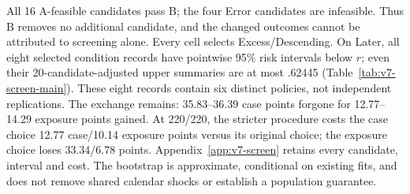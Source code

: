 All 16 A-feasible candidates pass B; the four Error candidates are infeasible. Thus B removes no additional candidate, and the changed outcomes cannot be attributed to screening alone. Every cell selects Excess/Descending. On Later, all eight selected condition records have pointwise 95\% risk intervals below $r$; even their 20-candidate-adjusted upper summaries are at most .62445 (Table~\ref{tab:v7-screen-main}). These eight records contain six distinct policies, not independent replications. The exchange remains: 35.83--36.39 case points forgone for 12.77--14.29 exposure points gained. At 220/220, the stricter procedure costs the case choice 12.77 case/10.14 exposure points versus its original choice; the exposure choice loses 33.34/6.78 points. Appendix~\ref{app:v7-screen} retains every candidate, interval and cost. The bootstrap is approximate, conditional on existing fits, and does not remove shared calendar shocks or establish a population guarantee.

